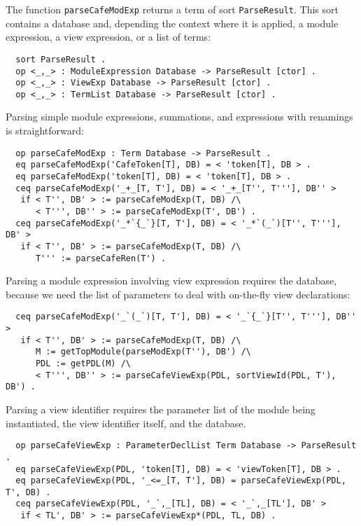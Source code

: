 The function \verb"parseCafeModExp" returns a term of sort \verb"ParseResult".
This sort contains a database and, depending the context where it is applied,
a module expression, a view expression, or a list of terms:

{\codesize
\begin{verbatim}
  sort ParseResult .
  op <_,_> : ModuleExpression Database -> ParseResult [ctor] .
  op <_,_> : ViewExp Database -> ParseResult [ctor] .
  op <_,_> : TermList Database -> ParseResult [ctor] .
\end{verbatim}
}

Parsing simple module expressions, summations, and expressions with renamings is
straightforward:

{\codesize
\begin{verbatim}
  op parseCafeModExp : Term Database -> ParseResult .
  eq parseCafeModExp('CafeToken[T], DB) = < 'token[T], DB > .
  eq parseCafeModExp('token[T], DB) = < 'token[T], DB > .
  ceq parseCafeModExp('_+_[T, T'], DB) = < '_+_[T'', T'''], DB'' >
   if < T'', DB' > := parseCafeModExp(T, DB) /\
      < T''', DB'' > := parseCafeModExp(T', DB') .
  ceq parseCafeModExp('_*`{_`}[T, T'], DB) = < '_*`(_`)[T'', T'''], DB' >
   if < T'', DB' > := parseCafeModExp(T, DB) /\
      T''' := parseCafeRen(T') .
\end{verbatim}
}

Parsing a module expression involving view expression requires the database, because
we need the list of parameters to deal with on-the-fly view declarations:

{\codesize
\begin{verbatim}
  ceq parseCafeModExp('_`(_`)[T, T'], DB) = < '_`{_`}[T'', T'''], DB'' >
   if < T'', DB' > := parseCafeModExp(T, DB) /\
      M := getTopModule(parseModExp(T''), DB') /\
      PDL := getPDL(M) /\
      < T''', DB'' > := parseCafeViewExp(PDL, sortViewId(PDL, T'), DB') .
\end{verbatim}
}

Parsing a view identifier requires the parameter list of the module being instantiated,
the view identifier itself, and the database.

{\codesize
\begin{verbatim}
  op parseCafeViewExp : ParameterDeclList Term Database -> ParseResult .
  eq parseCafeViewExp(PDL, 'token[T], DB) = < 'viewToken[T], DB > .
  eq parseCafeViewExp(PDL, '_<=_[T, T'], DB) = parseCafeViewExp(PDL, T', DB) .
  ceq parseCafeViewExp(PDL, '_`,_[TL], DB) = < '_`,_[TL'], DB' >
   if < TL', DB' > := parseCafeViewExp*(PDL, TL, DB) .
\end{verbatim}
}

